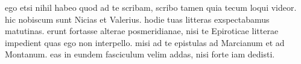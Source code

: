 


 ego etsi nihil habeo quod ad te scribam, scribo tamen quia tecum loqui videor. hic nobiscum sunt Nicias et Valerius. hodie tuas litteras exspectabamus matutinas. erunt fortasse alterae posmeridianae, nisi te Epiroticae litterae impedient quas ego non interpello. misi ad te epistulas ad Marcianum et ad Montanum. eas in eundem fasciculum velim addas, nisi forte iam dedisti.
